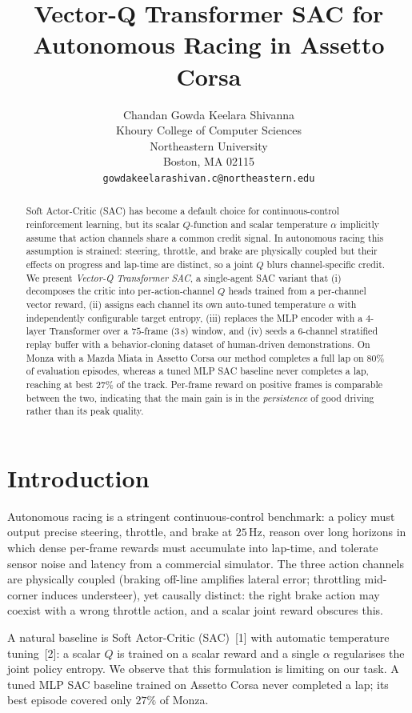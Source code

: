 \documentclass{article}
\title{Vector-Q Transformer SAC for Autonomous Racing in Assetto Corsa}
\author{%
  Chandan Gowda Keelara Shivanna \\
  Khoury College of Computer Sciences \\
  Northeastern University \\
  Boston, MA 02115 \\
  \texttt{gowdakeelarashivan.c@northeastern.edu}
}
\begin{document}
\maketitle

\begin{abstract}
  Soft Actor-Critic (SAC) has become a default choice for continuous-control
  reinforcement learning, but its scalar $Q$-function and scalar
  temperature $\alpha$ implicitly assume that action channels share a
  common credit signal. In autonomous racing this assumption is strained:
  steering, throttle, and brake are physically coupled but their effects
  on progress and lap-time are distinct, so a joint $Q$ blurs
  channel-specific credit. We present \emph{Vector-Q Transformer SAC}, a
  single-agent SAC variant that (i) decomposes the critic into
  per-action-channel $Q$ heads trained from a per-channel vector reward,
  (ii) assigns each channel its own auto-tuned temperature $\alpha$ with
  independently configurable target entropy, (iii) replaces the MLP
  encoder with a $4$-layer Transformer over a $75$-frame (3\,s) window,
  and (iv) seeds a $6$-channel stratified replay buffer with a
  behavior-cloning dataset of human-driven demonstrations. On Monza
  with a Mazda Miata in Assetto Corsa our method
  completes a full lap on $80\%$ of evaluation episodes, whereas a
  tuned MLP SAC baseline never completes a lap, reaching at best
  $27\%$ of the track.
  Per-frame reward on positive frames is comparable between the two,
  indicating that the main gain is in the \emph{persistence} of good
  driving rather than its peak quality.
\end{abstract}

\section{Introduction}
\label{sec:intro}

Autonomous racing is a stringent continuous-control benchmark: a policy
must output precise steering, throttle, and brake at $25$\,Hz, reason
over long horizons in which dense per-frame rewards must accumulate
into lap-time, and tolerate sensor noise and latency from a commercial
simulator. The three action channels are physically coupled (braking
off-line amplifies lateral error; throttling mid-corner induces
understeer), yet causally distinct: the right brake action may coexist
with a wrong throttle action, and a scalar joint reward obscures this.

A natural baseline is Soft Actor-Critic (SAC)~[1] with automatic
temperature tuning~[2]: a scalar $Q$ is trained on a scalar reward and
a single $\alpha$ regularises the joint policy entropy. We observe
that this formulation is limiting on our task. A tuned MLP SAC
baseline trained on Assetto Corsa never completed a lap; its best
episode covered only $27\%$ of Monza.
\end{document}
